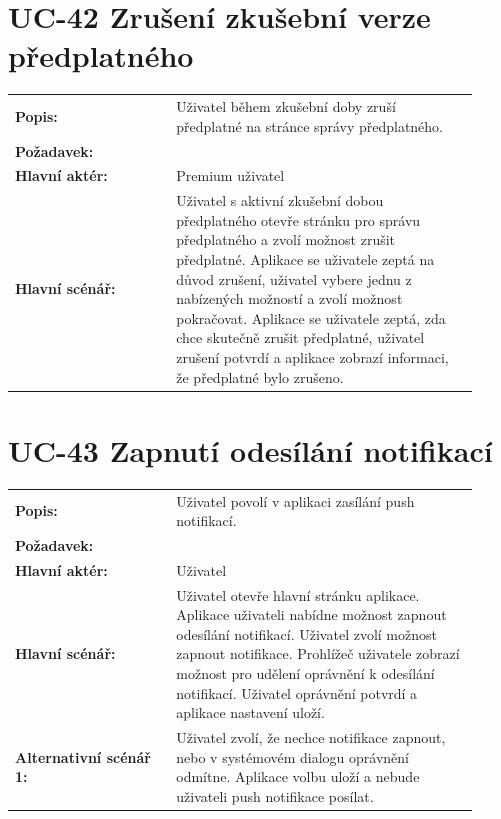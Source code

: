 \section{UC-42 Zrušení zkušební verze předplatného}\label{sec:uc-42}

\begin{tabular}{p{0.32\linewidth}p{0.6\linewidth}}
  \textbf{Popis:} & Uživatel během zkušební doby zruší předplatné na stránce správy předplatného. \\
  \textbf{Požadavek:} & \nameref{sec:fp-free-trial} \\
  \textbf{Hlavní aktér:} & Premium uživatel \\
  \textbf{Hlavní scénář:} & Uživatel s aktivní zkušební dobou předplatného otevře stránku pro správu předplatného a zvolí možnost zrušit předplatné. Aplikace se uživatele zeptá na důvod zrušení, uživatel vybere jednu z nabízených možností a zvolí možnost pokračovat. Aplikace se uživatele zeptá, zda chce skutečně zrušit předplatné, uživatel zrušení potvrdí a aplikace zobrazí informaci, že předplatné bylo zrušeno. \\
\end{tabular}

\section{UC-43 Zapnutí odesílání notifikací}\label{sec:uc-43}

\begin{tabular}{p{0.32\linewidth}p{0.6\linewidth}}
  \textbf{Popis:} & Uživatel povolí v aplikaci zasílání push notifikací. \\
  \textbf{Požadavek:} & \nameref{sec:fp-push-notifications} \\
  \textbf{Hlavní aktér:} & Uživatel \\
  \textbf{Hlavní scénář:} & Uživatel otevře hlavní stránku aplikace. Aplikace uživateli nabídne možnost zapnout odesílání notifikací. Uživatel zvolí možnost zapnout notifikace. Prohlížeč uživatele zobrazí možnost pro udělení oprávnění k odesílání notifikací. Uživatel oprávnění potvrdí a aplikace nastavení uloží. \\
  \textbf{Alternativní scénář 1:} & Uživatel zvolí, že nechce notifikace zapnout, nebo v systémovém dialogu oprávnění odmítne. Aplikace volbu uloží a nebude uživateli push notifikace posílat. \\
\end{tabular}


